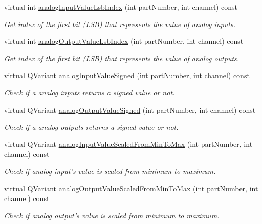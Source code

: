 \begin{DoxyCompactItemize}
virtual int \hyperlink{classmdt_device_modbus_wago_module_ab17c99ea4bdaa05fa1c2006d23c936e5}{analogInputValueLsbIndex} (int partNumber, int channel) const 
\begin{DoxyCompactList}\small\item\em Get index of the first bit (LSB) that represents the value of analog inputs. \end{DoxyCompactList}\item 
virtual int \hyperlink{classmdt_device_modbus_wago_module_a36876268b29010f7dc096c5e092e7240}{analogOutputValueLsbIndex} (int partNumber, int channel) const 
\begin{DoxyCompactList}\small\item\em Get index of the first bit (LSB) that represents the value of analog outputs. \end{DoxyCompactList}\item 
virtual QVariant \hyperlink{classmdt_device_modbus_wago_module_aead7f379126d8fb570a179dff857040f}{analogInputValueSigned} (int partNumber, int channel) const 
\begin{DoxyCompactList}\small\item\em Check if a analog inputs returns a signed value or not. \end{DoxyCompactList}\item 
virtual QVariant \hyperlink{classmdt_device_modbus_wago_module_a9a0e0e145ea269221042c6b5af26850c}{analogOutputValueSigned} (int partNumber, int channel) const 
\begin{DoxyCompactList}\small\item\em Check if a analog outputs returns a signed value or not. \end{DoxyCompactList}\item 
virtual QVariant \hyperlink{classmdt_device_modbus_wago_module_acabe25371f651f5f224abf89277be5f8}{analogInputValueScaledFromMinToMax} (int partNumber, int channel) const 
\begin{DoxyCompactList}\small\item\em Check if analog input's value is scaled from minimum to maximum. \end{DoxyCompactList}\item 
virtual QVariant \hyperlink{classmdt_device_modbus_wago_module_af2af1897221c28d03424c387f247e139}{analogOutputValueScaledFromMinToMax} (int partNumber, int channel) const 
\begin{DoxyCompactList}\small\item\em Check if analog output's value is scaled from minimum to maximum. \end{DoxyCompactList}\item 

\end{DoxyCompactItemize}
